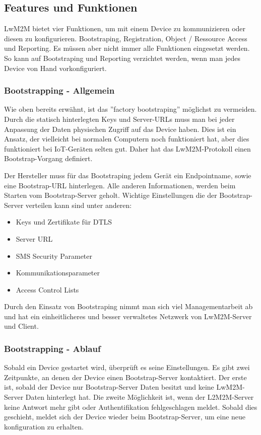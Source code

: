 \newpage

\subsection{Features und Funktionen}
LwM2M bietet vier Funktionen, um mit einem Device zu kommunizieren oder diesen zu konfigurieren. Bootstraping, Registration, Object / Ressource Access und Reporting. Es müssen aber nicht immer alle Funktionen eingesetzt werden. So kann auf Bootstraping und Reporting verzichtet werden, wenn man jedes Device von Hand vorkonfiguriert.
\subsubsection{Bootstrapping - Allgemein}
Wie oben bereits erwähnt, ist das ''factory bootstraping'' möglichst zu vermeiden. Durch die statisch hinterlegten Keys und Server-URLs muss man bei jeder Anpassung der Daten physischen Zugriff auf das Device haben. Dies ist ein Ansatz, der vielleicht bei normalen Computern noch funktioniert hat, aber dies funktioniert bei IoT-Geräten selten gut. Daher hat das LwM2M-Protokoll einen Bootstrap-Vorgang definiert.


Der Hersteller muss für das Bootstraping jedem Gerät ein Endpointname, sowie eine Bootstrap-URL hinterlegen. Alle anderen Informationen, werden beim Starten vom Bootstrap-Server geholt.
Wichtige Einstellungen die der Bootstrap-Server verteilen kann sind unter anderen\cite{BootstrapFeatures}:
\begin{itemize}
\item Keys  und Zertifikate für DTLS
\item Server URL
\item SMS Security Parameter
\item Kommunikationsparameter
\item Access Control Lists
\end{itemize}
Durch den Einsatz von Bootstraping nimmt man sich viel Managementarbeit ab und hat ein einheitlicheres und besser verwaltetes Netzwerk von LwM2M-Server und Client.
\subsubsection{Bootstrapping - Ablauf}
Sobald ein Device gestartet wird, überprüft es seine Einstellungen. Es gibt zwei Zeitpunkte, an denen der Device einen Bootstrap-Server kontaktiert. Der erste ist, sobald der Device nur Bootstrap-Server Daten besitzt und keine LwM2M-Server Daten hinterlegt hat. Die zweite Möglichkeit ist, wenn der L2M2M-Server keine Antwort mehr gibt oder Authentifikation fehlgeschlagen meldet. Sobald dies geschieht, meldet sich der Device wieder beim Bootstrap-Server, um eine neue konfiguration zu erhalten.

